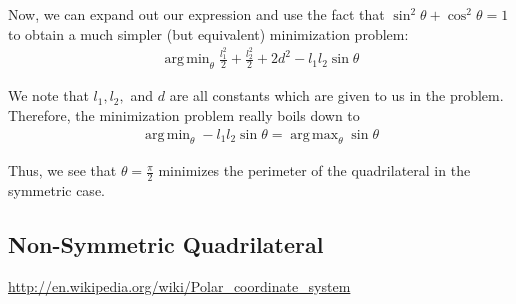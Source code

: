 \documentclass[12pt]{amsart}   %
\DeclareMathOperator*{\argmin}{arg\,min}
\DeclareMathOperator*{\argmax}{arg\,max}
\begin{document}
Now, we can expand out our expression and use the fact that $\sin^2 \theta + \cos^2 \theta = 1$ to obtain a much simpler (but equivalent) minimization problem:
\begin{eqnarray}
  \argmin_{\theta} \frac{l_1^2}{2} + \frac{l_2^2}{2} + 2d^2 - l_1 l_2 \sin \theta
\end{eqnarray}

We note that $l_1, l_2,$ and $d$ are all constants which are given to us in the problem. Therefore, the minimization problem really boils down to
\begin{eqnarray}
  \argmin_{\theta} - l_1 l_2 \sin \theta = \argmax_{\theta} \sin \theta
\end{eqnarray}

Thus, we see that $\theta = \frac{\pi}{2}$ minimizes the perimeter of the quadrilateral in the symmetric case.

\subsection{Non-Symmetric Quadrilateral}




\begin{thebibliography}{9}
\url{http://en.wikipedia.org/wiki/Polar_coordinate_system}
\end{thebibliography}
\end{document}
